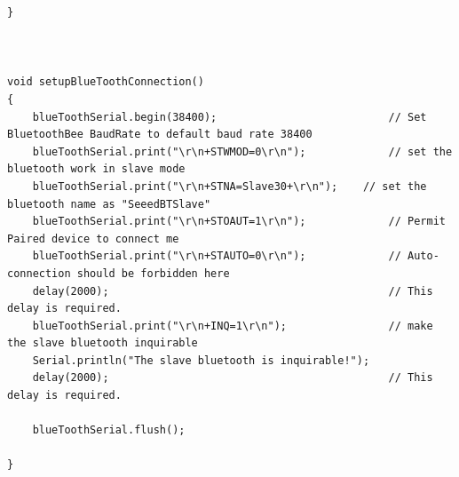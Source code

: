 \documentclass{article}
\begin{document}
\begin{lstlisting}[style=CStyle]
}



void setupBlueToothConnection()
{
	blueToothSerial.begin(38400);                           // Set BluetoothBee BaudRate to default baud rate 38400
	blueToothSerial.print("\r\n+STWMOD=0\r\n");             // set the bluetooth work in slave mode
	blueToothSerial.print("\r\n+STNA=Slave30+\r\n");    // set the bluetooth name as "SeeedBTSlave"
	blueToothSerial.print("\r\n+STOAUT=1\r\n");             // Permit Paired device to connect me
	blueToothSerial.print("\r\n+STAUTO=0\r\n");             // Auto-connection should be forbidden here
	delay(2000);                                            // This delay is required.
	blueToothSerial.print("\r\n+INQ=1\r\n");                // make the slave bluetooth inquirable
	Serial.println("The slave bluetooth is inquirable!");
	delay(2000);                                            // This delay is required.
	
	blueToothSerial.flush();

}


\end{lstlisting}
\end{document}
